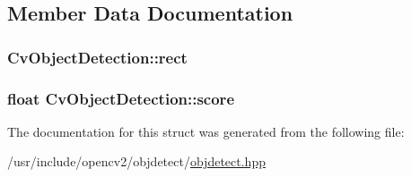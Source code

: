 \subsection{Member Data Documentation}
\hypertarget{structCvObjectDetection_a35f7ebdb5c485fffa439de21453d31f1}{
\subsubsection[{rect}]{ Cv\-Object\-Detection\-::rect}}\label{structCvObjectDetection_a35f7ebdb5c485fffa439de21453d31f1}
\hypertarget{structCvObjectDetection_a4afc4db52d02e6fa5a65d443df7b2a60}{
\subsubsection[{score}]{\setlength{\rightskip}{0pt plus 5cm}float Cv\-Object\-Detection\-::score}}\label{structCvObjectDetection_a4afc4db52d02e6fa5a65d443df7b2a60}


The documentation for this struct was generated from the following file\-:\begin{DoxyCompactItemize}
\item 
/usr/include/opencv2/objdetect/\hyperlink{objdetect_8hpp}{objdetect.\-hpp}\end{DoxyCompactItemize}
